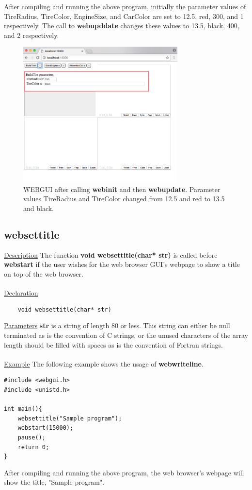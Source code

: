 After compiling and running the above program, initially the parameter values of TireRadius, TireColor, EngineSize,
and CarColor are set to 12.5, red, 300, and 1 respectively. The call to \textbf{webupddate} changes these values
to 13.5, black, 400, and 2 respectively.
\begin{figure}[b!]
\centering
\includegraphics[width=0.75\textwidth]{pix/buttons2.png}
\caption{\f{WEBGUI} after calling \textbf{webinit} and then \textbf{webupdate}. Parameter values TireRadius and TireColor
changed from 12.5 and red to 13.5 and black.}
\label{fig:4}
\end{figure}

\newpage
\subsection{websettitle}
\underline{Description} The function \textbf{void websettitle(char* str)} is called before \textbf{webstart} if the user wishes for the web browser GUI's
webpage to show a title on top of the web browser.\\
\\
\underline{Declaration}
\begin{verbatim} 
	void websettitle(char* str)
\end{verbatim}
\underline{Parameters} \textbf{str} is a string of length 80 or less. This string can either be null terminated as is the convention 
of C strings, or the unused characters of the array length should be filled with spaces as is the convention of Fortran strings.\\
\\
\underline{Example} The following example shows the usage of \textbf{webwriteline}.
\begin{verbatim}
#include <webgui.h>
#include <unistd.h>

int main(){
    websettitle("Sample program");
    webstart(15000);
    pause();
    return 0;
}
\end{verbatim}
After compiling and running the above program, the web browser's webpage will show the title, "Sample program".

